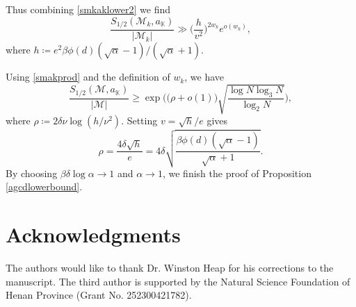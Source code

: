 \documentclass[12pt,reqno]{amsart}
\theoremstyle{definition}
\numberwithin{equation}{section}
\newcommand{\mbk}{\mathbb{K}}
\newcommand{\mcm}{\mathcal{M}}
\begin{document}
Thus combining \eqref{smkaklower2} we find
$$
\frac{S_{1/2}(\mcm_k,a_\mbk)}{|\mcm_k|} \gg \Big(\frac{h}{v^2} \Big)^{2w_k}e^{o(w_k)},
$$
where $h \coloneqq  e^2 \beta \phi(d)(\sqrt{\alpha}-1)/(\sqrt{\alpha}+1)$.
\par
Using \eqref{smakprod} and the definition of $w_k$, we have
$$
\frac{S_{1/2}(\mcm, a_\mbk)}{|\mcm|} \ge \exp \bigg(\big(\rho+o(1)\big)\sqrt{\frac{\log N \log_3 N}{\log_2 N}}\bigg),
$$
where $\rho \coloneqq 2 \delta \nu \log(h/\nu^2)$.
Setting $v = \sqrt{h}/e$ gives 
$$
\rho = \frac{4\delta\sqrt{h}}{e} = 4 \delta \sqrt{\frac{\beta\phi(d)(\sqrt{\alpha}-1)}{\sqrt{\alpha}+1}}.
$$
By choosing $\beta\delta\log\alpha \to 1$ and $\alpha \to 1$, we finish the proof of Proposition \ref{agcdlowerbound}.



\section*{Acknowledgments}
The authors would like to thank Dr. Winston Heap for his corrections to the manuscript. The third author is supported by the Natural Science Foundation of Henan Province (Grant No. 252300421782).




	
    
\end{document}
